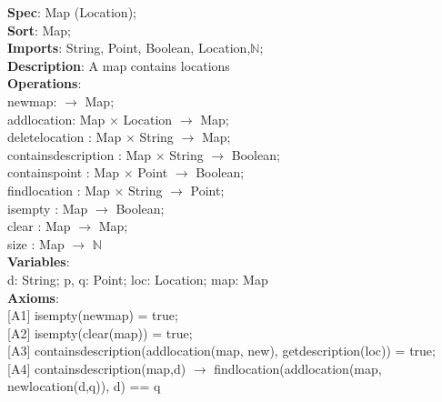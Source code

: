 \documentclass[12pt]{article}
\begin{document}
\begin{spacing}{1.5}
\noindent \textbf{Spec}: Map (Location);\\
\noindent \textbf{Sort}: Map;\\
\noindent \textbf{Imports}: String, Point, Boolean, Location,$\mathbb{N}$;\\
\noindent \textbf{Description}: A map contains locations\\
\noindent \textbf{Operations}:\\
\hspace*{5mm} newmap: $\rightarrow$ Map;\\
\hspace*{5mm} addlocation: Map $\times$ Location $\rightarrow$ Map;\\
\hspace*{5mm} deletelocation : Map $\times$ String $\rightarrow$ Map;\\
\hspace*{5mm} containsdescription : Map $\times$ String $\rightarrow$ Boolean;\\
\hspace*{5mm} containspoint : Map $\times$ Point  $\rightarrow$ Boolean;\\
\hspace*{5mm} findlocation : Map $\times$ String  $\rightarrow$ Point;\\
\hspace*{5mm} isempty : Map $\rightarrow$ Boolean;\\
\hspace*{5mm} clear : Map $\rightarrow$ Map;\\
\hspace*{5mm} size : Map $\rightarrow$ $\mathbb{N}$ \\
\noindent \textbf{Variables}:\\
\hspace*{5mm} d: String; p, q: Point; loc: Location; map: Map\\
\noindent \textbf{Axioms}:\\
\hspace*{5mm} [A1] isempty(newmap) = true;\\
\hspace*{5mm} [A2] isempty(clear(map)) = true;\\
\hspace*{5mm} [A3] containsdescription(addlocation(map, new), getdescription(loc)) = true;\\
\hspace*{5mm} [A4] containsdescription(map,d) $\rightarrow$ findlocation(addlocation(map, newlocation(d,q)), d) \hspace*{15mm} == q \\

\end{spacing}
\end{document}
